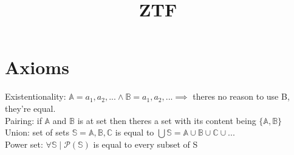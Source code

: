 \documentclass{article}
\title{ZTF}
\theoremstyle{definition}
\newcommand{\A}{\mathbb{A}}
\newcommand{\B}{\mathbb{B}}
\newcommand{\C}{\mathbb{C}}
\begin{document}
    \maketitle
    \section{Axioms}

    Existentionality: $\mathbb{A}={a_1,a_2,...} \land \mathbb{B}={a_1,a_2,...} \implies $ theres no reason to use B, they're equal. 
    \\
    Pairing: if $\mathbb{A}$ and $\mathbb{B}$ is at set then theres a set with its content being $\{\A, \B\}$
\\
    Union: set of sets $\mathbb{S}={\A, \B, \C}$ is equal to $\bigcup \mathbb{S}=\A\cup\B\cup\C\cup...$
    \\ 
    Power set: $\forall \mathbb{S} \mid \mathcal{P}(\mathbb{S})$ is equal to every subset of S 
    
\end{document}
